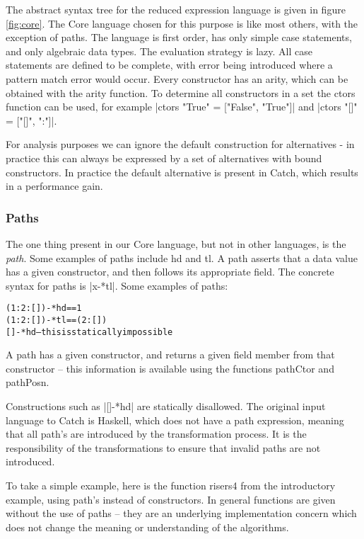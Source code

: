 \documentclass[preprint]{sigplanconf}
\newcommand{\C}[1]{\textsf{#1}}
\newenvironment{code}{\begin{alltt}\small}{\end{alltt}}
\begin{document}
The abstract syntax tree for the reduced expression language is given in figure \ref{fig:core}. The Core language chosen for this purpose is like most others, with the exception of paths. The language is first order, has only simple case statements, and only algebraic data types. The evaluation strategy is lazy. All case statements are defined to be complete, with error being introduced where a pattern match error would occur. Every constructor has an arity, which can be obtained with the \C{arity} function. To determine all constructors in a set the \C{ctors} function can be used, for example |ctors "True" = ["False", "True"]| and |ctors "[]" = ["[]", ":"]|.

For analysis purposes we can ignore the default construction for alternatives - in practice this can always be expressed by a set of alternatives with bound constructors. In practice the default alternative is present in Catch, which results in a performance gain.

\subsubsection{Paths}

The one thing present in our Core language, but not in other languages, is the \textit{path}. Some examples of paths include \C{hd} and \C{tl}. A path asserts that a data value has a given constructor, and then follows its appropriate field. The concrete syntax for paths is |x-*tl|. Some examples of paths:

\begin{code}
(1:2:[])-*hd == 1
(1:2:[])-*tl == (2:[])
[]-*hd -- this is statically impossible
\end{code}

A path has a given constructor, and returns a given field member from that constructor -- this information is available using the functions \C{pathCtor} and \C{pathPosn}.

Constructions such as |[]-*hd| are statically disallowed. The original input language to Catch is Haskell, which does not have a path expression, meaning that all path's are introduced by the transformation process. It is the responsibility of the transformations to ensure that invalid paths are not introduced.

To take a simple example, here is the function \C{risers4} from the introductory example, using path's instead of constructors. In general functions are given without the use of paths -- they are an underlying implementation concern which does not change the meaning or understanding of the algorithms.
\end{document}
